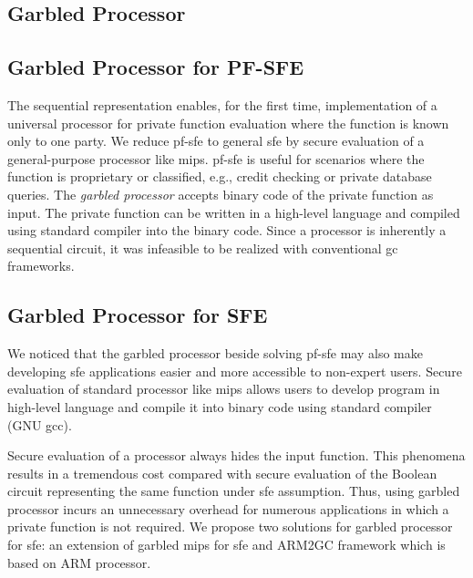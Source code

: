 \subsection{Garbled Processor}
\subsection{Garbled Processor for PF-SFE}
The sequential representation enables, for the first time, implementation of a universal processor for private function evaluation where the function is known only to one party.
We reduce \acrfull{pf-sfe} to general \acrshort{sfe} by secure evaluation of a general-purpose processor like \gls{mips}.
\acrshort{pf-sfe} is useful for scenarios where the function is proprietary or classified, e.g., credit checking or private database queries.
The \textit{garbled processor} accepts binary code of the private function as input.
The private function can be written in a high-level language and compiled using standard compiler into the binary code.
Since a processor is inherently a sequential circuit, it was infeasible to be realized with conventional \acrshort{gc} frameworks.

\subsection{Garbled Processor for SFE}
We noticed that the garbled processor beside solving pf-sfe may also make developing sfe applications easier and more accessible to non-expert users.
Secure evaluation of standard processor like mips allows users to develop program in high-level language and compile it into binary code using standard compiler (GNU gcc).

Secure evaluation of a processor always hides the input function.
This phenomena results in a tremendous cost compared with secure evaluation of the Boolean circuit representing the same function under sfe assumption.
Thus, using garbled processor incurs an unnecessary overhead for numerous applications in which a private function is not required.
We propose two solutions for garbled processor for sfe: an extension of garbled mips for \acrshort{sfe} and ARM2GC framework which is based on ARM processor.

